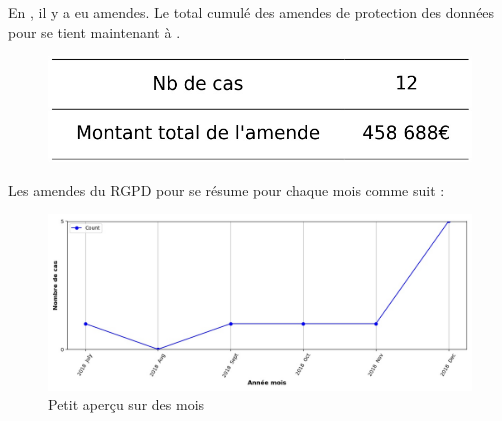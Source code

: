 \documentclass[french]{article}
\begin{document}
	\begin{multicols}{2}
	
	En ,  il y a eu \textbf{} amendes.
	Le total cumulé des amendes de protection des données pour  se tient maintenant à \textbf{}.
	
	\begin{figure}[H]
	\centering\includegraphics[width=1\linewidth]{graphs/counter_year}
	\end{figure}


	Les amendes du RGPD pour  se résume pour chaque mois comme suit :

	\begin{figure}
	[H]\centering\includegraphics[width = 1.2\linewidth]{graphs/NbFinesPerMonth_year_graph}
	\caption{Petit aperçu sur des mois }
	\end{figure}

	\end{multicols}
\end{document}
